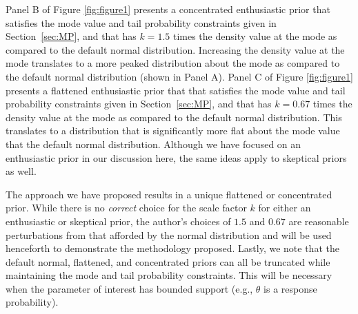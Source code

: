 \documentclass[useAMS,usenatbib,referee]{biom}
\begin{document}
{Panel B of Figure \ref{fig:figure1} presents a concentrated enthusiastic prior that satisfies 
the mode value and tail probability constraints given in Section~\ref{sec:MP}, and that has $k=1.5$ times the density value at the mode as compared to the default normal distribution. 
Increasing the density value at the mode translates to a more peaked distribution about the mode as compared to the default normal distribution (shown in Panel A). 
%
Panel C of Figure \ref{fig:figure1} presents a flattened enthusiastic prior that that satisfies the mode value and tail probability constraints given in Section~\ref{sec:MP}, and
that has $k=0.67$ times the density value at the mode as compared to the default normal distribution. This translates to a distribution that is significantly more flat about the mode value that the default normal distribution. 
%
Although we have focused on an enthusiastic prior in our discussion here, the same ideas apply to skeptical priors as well.

The approach we have proposed results in a unique flattened or concentrated prior.
While there is no \textit{correct} choice for the scale factor $k$ for either an enthusiastic or skeptical prior, the author's choices
of $1.5$ and $0.67$ are reasonable perturbations from that afforded by the normal distribution and will be used henceforth to 
demonstrate the methodology proposed. 
Lastly, we note that the default normal, flattened, and concentrated priors can all be truncated while maintaining the mode and tail 
probability constraints.
This will be necessary when the parameter of interest has bounded support (e.g., $\theta$ is a response probability).
}
\end{document}
